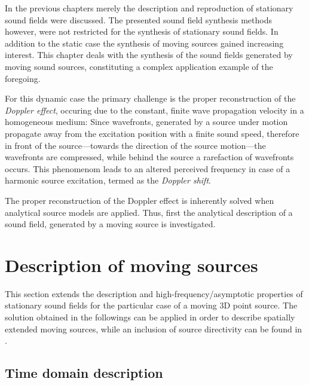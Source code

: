 In the previous chapters merely the description and reproduction of stationary sound fields were discussed.
The presented sound field synthesis methods however, were not restricted for the synthesis of stationary sound fields.
In addition to the static case the synthesis of moving sources gained increasing interest.
This chapter deals with the synthesis of the sound fields generated by moving sound sources, constituting a complex application example of the foregoing.

For this dynamic case the primary challenge is the proper reconstruction of the \emph{Doppler effect}, occuring due to the constant, finite wave propagation velocity in a homogeneous medium:
Since wavefronts, generated by a source under motion propagate away from the excitation position with a finite sound speed, therefore in front of the source---towards the direction of the source motion---the wavefronts are compressed, while behind the source a rarefaction of wavefronts occurs.
This phenomenom leads to an altered perceived frequency in case of a harmonic source excitation, termed as the \emph{Doppler shift}.

The proper reconstruction of the Doppler effect is inherently solved when analytical source models are applied.
Thus, first the analytical description of a sound field, generated by a moving source is investigated.

\section{Description of moving sources}

This section extends the description and high-frequency/asymptotic properties of stationary sound fields for the particular case of a moving 3D point source.
The solution obtained in the followings can be applied in order to describe spatially extended moving sources, while an inclusion of source directivity can be found in \cite{Warren1976, Ahrens2011_moving_source_WFS}.

\subsection{Time domain description}
	
